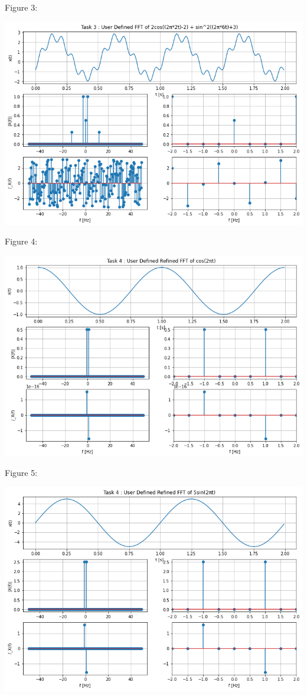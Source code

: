 \documentclass[nobib]{MSword}
\begin{document}
Figure 3:

\includegraphics[scale = 0.6]
{txt/Lab9Fig3.png}

Figure 4:

\includegraphics[scale = 0.6]
{txt/Lab9Fig4.png}

Figure 5:

\includegraphics[scale = 0.6]
{txt/Lab9Fig5.png}
\end{document}
